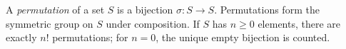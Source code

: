 
A \emph{permutation} of a set $S$ is a bijection $\sigma:S\to S$. Permutations form the symmetric group on $S$ under composition. If $S$ has $n\ge0$ elements, there are exactly $n!$ permutations; for $n=0$, the unique empty bijection is counted.
